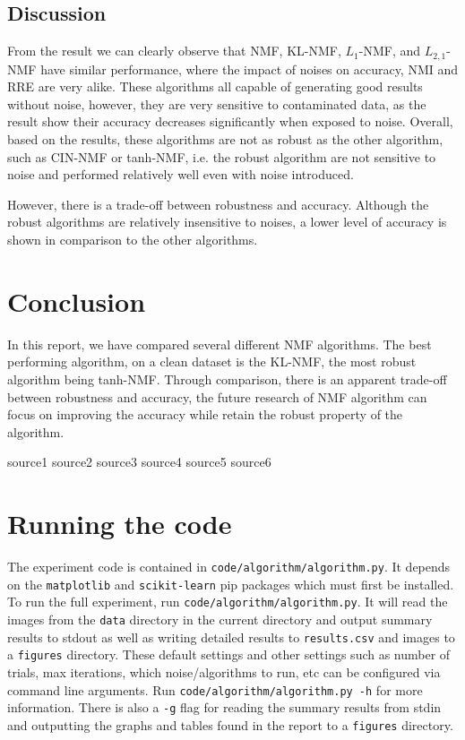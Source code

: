 \documentclass{article} %
\begin{document}
\subsection{Discussion}
From the result we can clearly observe that NMF, KL-NMF, $L_1$-NMF, and $L_{2,1}$-NMF have similar performance, where the impact of noises on accuracy, NMI and RRE are very alike. These algorithms all capable of generating good results without noise, however, they are very sensitive to contaminated data, as the result show their accuracy decreases significantly when exposed to noise. Overall, based on the results, these algorithms are not as robust as the other algorithm, such as CIN-NMF or tanh-NMF, i.e. the robust algorithm are not sensitive to noise and performed relatively well even with noise introduced.

However, there is a trade-off between robustness and accuracy. Although the robust algorithms are relatively insensitive to noises, a lower level of accuracy is shown in comparison to the other algorithms. 

\section{Conclusion}
In this report, we have compared several different NMF algorithms. The best performing algorithm, on a clean dataset is the KL-NMF, the most robust algorithm being tanh-NMF. Through comparison, there is an apparent trade-off between robustness and accuracy, the future research of NMF algorithm can focus on improving the accuracy while retain the robust property of the algorithm. 


\begin{thebibliography}{9}
 source1
 source2
 source3
 source4
 source5
 source6
\end{thebibliography}

\appendix

\section{Running the code}
The experiment code is contained in \texttt{code/algorithm/algorithm.py}. It depends on the \texttt{matplotlib} and \texttt{scikit-learn} pip packages which must first be installed. To run the full experiment, run \texttt{code/algorithm/algorithm.py}. It will read the images from the \texttt{data} directory in the current directory and output summary results to stdout as well as writing detailed results to \texttt{results.csv} and images to a \texttt{figures} directory. These default settings and other settings such as number of trials, max iterations, which noise/algorithms to run, etc can be configured via command line arguments. Run \texttt{code/algorithm/algorithm.py -h} for more information. There is also a \texttt{-g} flag for reading the summary results from stdin and outputting the graphs and tables found in the report to a \texttt{figures} directory.
\end{document}
